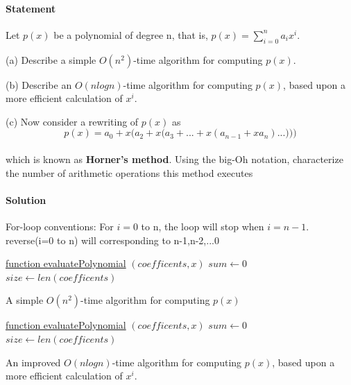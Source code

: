 \documentclass{article}
\DeclarePairedDelimiter{\ceil}{\lceil}{\rceil}
\begin{document}
  \paragraph{Statement}
  Let $p(x)$ be a polynomial of degree n, that is, $p(x) = \sum_{i=0}^{n}a_{i}x^{i}$.
  \par (a) Describe a simple $O(n^2)$-time algorithm for computing $p(x)$.
  \par (b) Describe an $O(nlogn)$-time algorithm for computing $p(x)$, based upon a more efficient calculation of $x^i$.
  \par (c) Now consider a rewriting of $p(x)$ as
  \begin{equation*}
    p(x) = a_{0} + x\Big(a_{2} + x\big(a_{3}+...+x(a_{n-1}+xa_{n})...)\big)\Big)
  \end{equation*}\\
  which is known as \textbf{Horner’s method}. Using the big-Oh notation, characterize the number of arithmetic operations this method executes
  \paragraph{Solution}
  For-loop conventions: For $i=0$ to n, the loop will stop when $i=n-1$. reverse(i=0 to n) will corresponding to n-1,n-2,...0 
  \begin{algorithm}[h!]

    \underline{function evaluatePolynomial} $(coefficents,x)$\;
    $sum \longleftarrow 0$\;
    $size \longleftarrow len(coefficents)$\;
    \;
    \caption{A simple $O(n^2)$-time algorithm for computing $p(x)$}
  \end{algorithm}
  \newpage
  \begin{algorithm}[t!]

    \underline{function evaluatePolynomial} $(coefficents,x)$\;
    $sum \longleftarrow 0$\;
    $size \longleftarrow len(coefficents)$\;
    \;
    \caption{An improved $O(nlogn)$-time algorithm for computing $p(x)$, based upon a more efficient calculation of $x^i$.}
  \end{algorithm}
  
\end{document}
